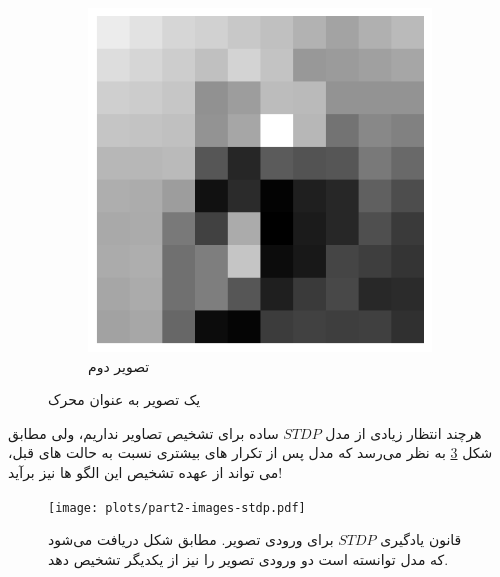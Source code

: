\begin{figure}[htbp]
\begin{subfigure}[b]{0.35\textwidth}
                \includegraphics[width=\textwidth]{images/bird-resized.jpg}
                \caption{تصویر دوم}
                \label{fig:part2-input-image2}
            \end{subfigure}
            \caption{یک تصویر به عنوان محرک}
            \label{fig:part2-input-images}
        \end{figure}

        هرچند انتظار زیادی از مدل 
        $STDP$ 
        ساده برای تشخیص تصاویر نداریم، ولی مطابق شکل 
        \ref{fig:part2-images-stdp}
        به نظر می‌رسد که مدل پس از تکرار های بیشتری نسبت به حالت های قبل، می تواند از عهده تشخیص این الگو ها نیز برآید!
        \begin{figure}[htbp]
            \centering
            \texttt{[image: plots/part2-images-stdp.pdf]} 
            \caption{قانون یادگیری 
            $STDP$ برای ورودی تصویر. 
            مطابق شکل دریافت می‌شود که مدل توانسته است دو ورودی تصویر را نیز از یکدیگر تشخیص دهد.
            }
            \label{fig:part2-images-stdp}
        \end{figure}
        

